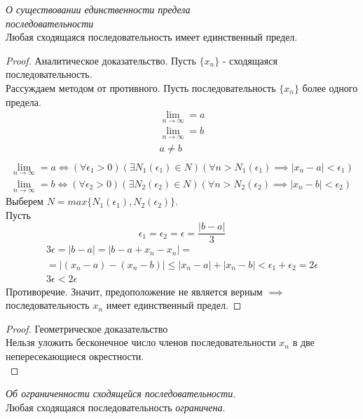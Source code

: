 \begin{theorem}
  \textit{О существовании единственности предела \\ последовательности} \\
  Любая сходящаяся последовательность имеет единственный предел.
\end{theorem}
\begin{proof} Аналитическое доказательство.
  Пусть $\{x_{n}\} $ - сходящаяся последовательность. \\
  Рассуждаем методом от противного. Пусть последовательность $\{x_{n}\} $ более одного предела.
  \begin{gather*}
    \lim_{n \to \infty} = a \\
    \lim_{n \to \infty} = b \\
    a \neq b \\
  \end{gather*}
  \begin{gather}
    \lim_{n \to \infty} = a \iff (\forall \epsilon_1 > 0)(\exists N_1(\epsilon_1) \in N)(\forall n > N_1(\epsilon_1) \implies |x_{n} - a| < \epsilon_1) \\
    \lim_{n \to \infty} = b \iff (\forall \epsilon_2 > 0)(\exists N_2(\epsilon_2) \in N)(\forall n > N_2(\epsilon_2) \implies |x_{n} - b| < \epsilon_2)  
  \end{gather} 
  Выберем $N=max \{N_1\left( \epsilon_1 \right) , N_2\left( \epsilon_2 \right) \}$. \\
  Пусть 
  \[
    \epsilon_1 = \epsilon_2 = \epsilon = \frac{|b - a|}{3}
  \]
  \begin{gather*}
  3 \epsilon = |b - a| = |b - a + x_{n} - x_{n}| = \\
  = |(x_{n} - a) - (x_{n} - b)| \le |x_{n} - a| + |x_{n} - b| < \epsilon_1 + \epsilon_2 = 2 \epsilon \\
  3 \epsilon < 2 \epsilon
  \end{gather*}
  Противоречие. Значит, предоположение не является верным $\implies$ последовательность $x_{n}$ имеет единственный предел.
\end{proof}

\begin{proof} Геометрическое доказательство\\
  Нельзя уложить бесконечное число членов последовательности $x_{n}$ в две непересекающиеся окрестности. \\
\end{proof}

\begin{theorem}
  \textit{Об ограниченности сходящейся последовательности}. \\ 
  Любая сходящаяся последовательность \textit{ограничена}. 
\end{theorem}

